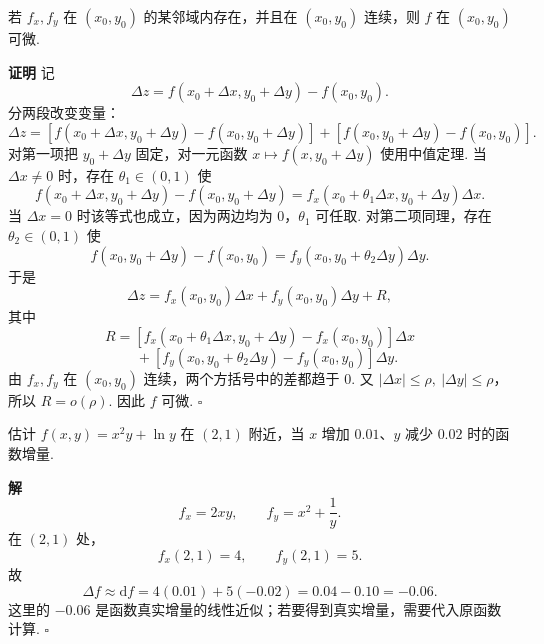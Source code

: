 \documentclass[fontset=fandol]{ctexart}
\newenvironment{proofdetail}{\par\noindent\textbf{证明}\quad}{\hfill$\square$\par\vspace{0.8em}}
\newenvironment{solution}{\par\noindent\textbf{解}\quad}{\hfill$\square$\par\vspace{0.8em}}
\newcommand{\dd}{\mathrm{d}}
\begin{document}
\begin{theorem}[偏导连续推出可微]
若 $f_x,f_y$ 在 $(x_0,y_0)$ 的某邻域内存在，并且在 $(x_0,y_0)$ 连续，则 $f$ 在 $(x_0,y_0)$ 可微.
\end{theorem}
\begin{proofdetail}
记
\[
\Delta z=f(x_0+\Delta x,y_0+\Delta y)-f(x_0,y_0).
\]
分两段改变变量：
\[
\Delta z=[f(x_0+\Delta x,y_0+\Delta y)-f(x_0,y_0+\Delta y)]
+[f(x_0,y_0+\Delta y)-f(x_0,y_0)].
\]
对第一项把 $y_0+\Delta y$ 固定，对一元函数 $x\mapsto f(x,y_0+\Delta y)$ 使用中值定理. 当 $\Delta x\neq0$ 时，存在 $\theta_1\in(0,1)$ 使
\[
f(x_0+\Delta x,y_0+\Delta y)-f(x_0,y_0+\Delta y)
=f_x(x_0+\theta_1\Delta x,y_0+\Delta y)\Delta x.
\]
当 $\Delta x=0$ 时该等式也成立，因为两边均为 $0$，$\theta_1$ 可任取. 对第二项同理，存在 $\theta_2\in(0,1)$ 使
\[
f(x_0,y_0+\Delta y)-f(x_0,y_0)
=f_y(x_0,y_0+\theta_2\Delta y)\Delta y.
\]
于是
\[
\Delta z=f_x(x_0,y_0)\Delta x+f_y(x_0,y_0)\Delta y+R,
\]
其中
\[
R=[f_x(x_0+\theta_1\Delta x,y_0+\Delta y)-f_x(x_0,y_0)]\Delta x
\]
\[
\quad+[f_y(x_0,y_0+\theta_2\Delta y)-f_y(x_0,y_0)]\Delta y.
\]
由 $f_x,f_y$ 在 $(x_0,y_0)$ 连续，两个方括号中的差都趋于 $0$. 又 $|\Delta x|\leq\rho,\ |\Delta y|\leq\rho$，所以 $R=o(\rho)$. 因此 $f$ 可微.
\end{proofdetail}

\begin{center}
\end{center}

\begin{example}[全微分近似]
估计 $f(x,y)=x^2y+\ln y$ 在 $(2,1)$ 附近，当 $x$ 增加 $0.01$、$y$ 减少 $0.02$ 时的函数增量.
\end{example}
\begin{solution}
\[
f_x=2xy,\qquad f_y=x^2+\frac1y.
\]
在 $(2,1)$ 处，
\[
f_x(2,1)=4,\qquad f_y(2,1)=5.
\]
故
\[
\Delta f\approx \dd f=4(0.01)+5(-0.02)=0.04-0.10=-0.06.
\]
这里的 $-0.06$ 是函数真实增量的线性近似；若要得到真实增量，需要代入原函数计算.
\end{solution}
\end{document}
